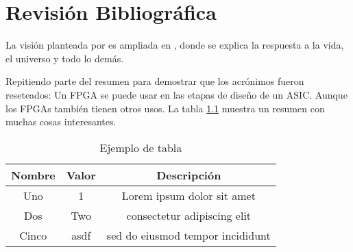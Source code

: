 \chapter{Revisión Bibliográfica}

La visión planteada por \cite{DUMMY:1} es ampliada en \cite{hitchhiker:first}, donde se explica la respuesta a la vida, el universo y todo lo demás.

Repitiendo parte del resumen para demostrar que los acrónimos fueron reseteados: Un \ac{FPGA} se puede usar en las etapas de diseño de un \ac{ASIC}.
Aunque los \acp{FPGA} también tienen otros usos.
La tabla \ref{tab:ejemplo} muestra un resumen con muchas cosas interesantes.


\begin{table}[tb]
	\centering
	\caption{Ejemplo de tabla}
	\label{tab:ejemplo}
	\begin{tabular}{c|c|c}
		Nombre & Valor & Descripción\\
		\hline
		Uno    & 1    & Lorem ipsum dolor sit amet \\
		Dos    & Two  &  consectetur adipiscing elit\\
		Cinco  & asdf & sed do eiusmod tempor incididunt\\
	\end{tabular}
\end{table}
